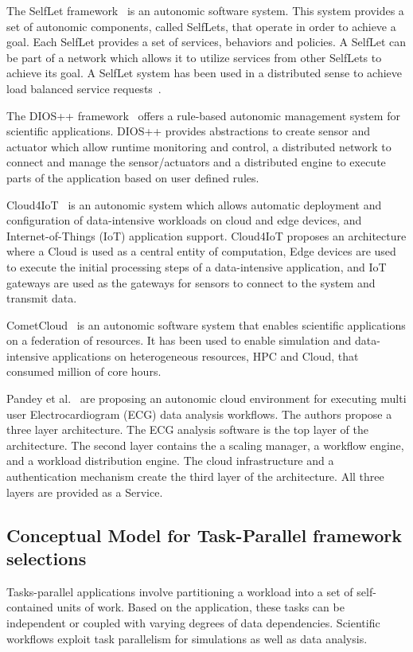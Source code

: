 The SelfLet framework~\cite{bindelli2008building} is an autonomic software system. 
This system provides a set of autonomic components, called SelfLets, that operate 
in order to achieve a goal. Each SelfLet provides a set of services, behaviors 
and policies. A SelfLet can be part of a network which allows it to utilize 
services from other SelfLets to achieve its goal. A SelfLet system has been used 
in a distributed sense to achieve load balanced service requests~\cite{calcavecchia2010emergence}.

The DIOS++ framework~\cite{liu2003dios} offers a rule-based autonomic management 
system for scientific applications. DIOS++ provides abstractions to create sensor 
and actuator which allow runtime monitoring and control, a distributed network to 
connect and manage the sensor/actuators and a distributed engine to execute parts 
of the application based on user defined rules.

Cloud4IoT~\cite{pizzolli2016cloud4iot} is an autonomic system which allows automatic 
deployment and configuration of data-intensive workloads on cloud and edge devices, 
and Internet-of-Things (IoT) application support. Cloud4IoT proposes an architecture 
where a Cloud is used as a central entity of computation, Edge devices are used to 
execute the initial processing steps of a data-intensive application, and IoT 
gateways are used as the gateways for sensors to connect to the system and 
transmit data.

CometCloud~\cite{diazmontes2015cometcloud} is an autonomic software system that 
enables scientific applications on a federation of resources. It has been used 
to enable simulation and data-intensive applications on heterogeneous resources, 
HPC and Cloud, that consumed million of core hours.

Pandey et al.~\cite{pandey2012autonomic} are proposing an autonomic cloud 
environment for executing multi user Electrocardiogram (ECG) data analysis 
workflows. The authors propose a three layer architecture. The ECG analysis 
software is the top layer of the architecture. The second layer contains the a 
scaling manager, a workflow engine, and a workload distribution engine. The cloud 
infrastructure and a authentication mechanism create the third layer of the 
architecture. All three layers are provided as a Service.  

\subsection{Conceptual Model for Task-Parallel framework selections}
Tasks-parallel applications involve partitioning a workload into a set of 
self-contained units of work. Based on the application, these tasks can be 
independent or coupled with varying degrees of data dependencies. Scientific 
workflows exploit task parallelism for simulations as well as data analysis.

